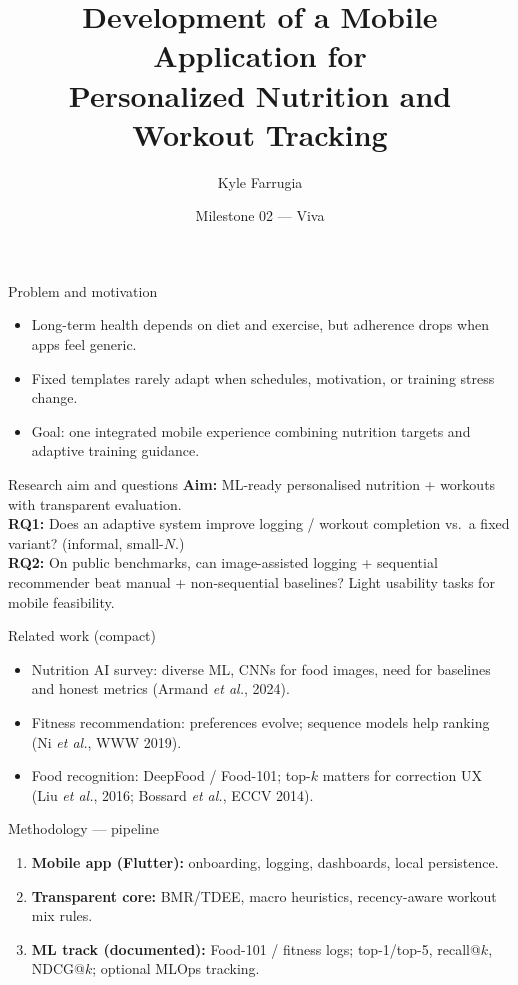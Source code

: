 \documentclass[aspectratio=169,11pt]{beamer}
\title[Nutri \& Work]{Development of a Mobile Application for\\Personalized Nutrition and Workout Tracking}
\author{Kyle Farrugia}
\institute{Institute of Information and Communication Technology\\SWD 6.2A --- B.Sc. (Hons) Software Development}
\date{Milestone 02 --- Viva}
\begin{document}
\begin{frame}
  \titlepage
\end{frame}

\begin{frame}{Problem and motivation}
  \begin{itemize}
    \item Long-term health depends on diet and exercise, but adherence drops when apps feel generic.
    \item Fixed templates rarely adapt when schedules, motivation, or training stress change.
    \item Goal: one integrated mobile experience combining nutrition targets and adaptive training guidance.
  \end{itemize}
\end{frame}

\begin{frame}{Research aim and questions}
  \textbf{Aim:} ML-ready personalised nutrition + workouts with transparent evaluation.\\[0.6em]
  \textbf{RQ1:} Does an adaptive system improve logging / workout completion vs.\ a fixed variant? (informal, small-$N$.)\\[0.4em]
  \textbf{RQ2:} On public benchmarks, can image-assisted logging + sequential recommender beat manual + non-sequential baselines? Light usability tasks for mobile feasibility.
\end{frame}

\begin{frame}{Related work (compact)}
  \begin{itemize}
    \item Nutrition AI survey: diverse ML, CNNs for food images, need for baselines and honest metrics (Armand \emph{et al.}, 2024).
    \item Fitness recommendation: preferences evolve; sequence models help ranking (Ni \emph{et al.}, WWW 2019).
    \item Food recognition: DeepFood / Food-101; top-$k$ matters for correction UX (Liu \emph{et al.}, 2016; Bossard \emph{et al.}, ECCV 2014).
  \end{itemize}
\end{frame}

\begin{frame}{Methodology --- pipeline}
  \begin{enumerate}
    \item \textbf{Mobile app (Flutter):} onboarding, logging, dashboards, local persistence.
    \item \textbf{Transparent core:} BMR/TDEE, macro heuristics, recency-aware workout mix rules.
    \item \textbf{ML track (documented):} Food-101 / fitness logs; top-1/top-5, recall@$k$, NDCG@$k$; optional MLOps tracking.
  \end{enumerate}
\end{frame}
\end{document}
